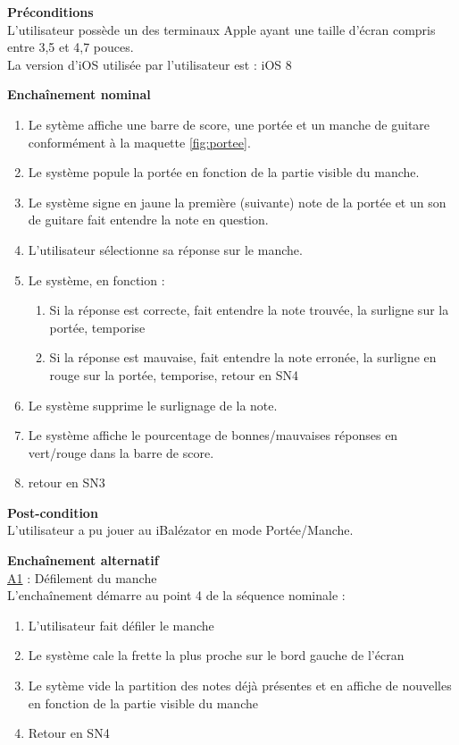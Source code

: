 \documentclass{scrreprt}
\begin{document}
\bigbreak
\textbf{Préconditions}\\
L'utilisateur possède un des terminaux Apple ayant une taille d'écran compris entre 3,5 et 4,7 pouces.\\
La version d'iOS utilisée par l'utilisateur est : iOS 8
\bigbreak


\textbf{Enchaînement nominal}\\
\begin{enumerate}
\item Le sytème affiche une barre de score, une portée et un manche de guitare conformément à la maquette \ref{fig:portee}.
\item Le système popule la portée en fonction de la partie visible du manche. 
\item Le système signe en jaune la première (suivante) note de la portée et un son de guitare fait entendre la note en question.
\item L'utilisateur sélectionne sa réponse sur le manche.
\item Le système, en fonction : 
 \begin{enumerate}
    \item Si la réponse est correcte, fait entendre la note trouvée, la surligne sur la portée, temporise 
    \item Si la réponse est mauvaise, fait entendre la note erronée, la surligne en rouge sur la portée, temporise, retour en SN4
  \end{enumerate}
\item Le système supprime le surlignage de la note.
\item Le système affiche le pourcentage de bonnes/mauvaises réponses en vert/rouge dans la barre de score.
\item retour en SN3
\end{enumerate}
\bigbreak

\textbf{Post-condition}\\
L'utilisateur a pu jouer au iBalézator en mode Portée/Manche.

\bigbreak

\textbf{Enchaînement alternatif}\\
\underline{A1} : Défilement du manche\\
L'enchaînement démarre au point 4 de la séquence nominale :\\
\begin{enumerate}
\item L'utilisateur fait défiler le manche
\item Le système cale la frette la plus proche sur le bord gauche de l'écran
\item Le sytème vide la partition des notes déjà présentes et en affiche de nouvelles en fonction de la partie visible du manche
\item Retour en SN4
\end{enumerate}
\end{document}
